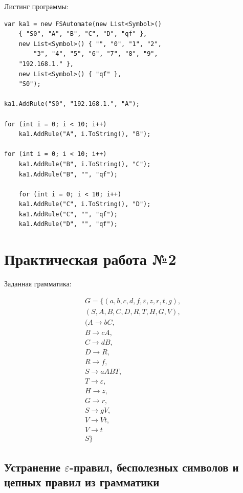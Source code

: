 \documentclass[12pt]{extarticle}
\begin{document}
	\noindent Листинг программы:
		
	\begin{lstlisting}
var ka1 = new FSAutomate(new List<Symbol>()
	{ "S0", "A", "B", "C", "D", "qf" },
	new List<Symbol>() { "", "0", "1", "2",
		"3", "4", "5", "6", "7", "8", "9",
	"192.168.1." },
	new List<Symbol>() { "qf" },
	"S0");
	
ka1.AddRule("S0", "192.168.1.", "A");
		
for (int i = 0; i < 10; i++)
	ka1.AddRule("A", i.ToString(), "B");
		
for (int i = 0; i < 10; i++)
	ka1.AddRule("B", i.ToString(), "C");
	ka1.AddRule("B", "", "qf");
		
	for (int i = 0; i < 10; i++)
	ka1.AddRule("C", i.ToString(), "D");
	ka1.AddRule("C", "", "qf");
	ka1.AddRule("D", "", "qf");
	\end{lstlisting}
	
	\section{Практическая работа №2}
	
	Заданная грамматика:
	
	\begin{gather*}
		G = \{(a, b, c, d, f, \varepsilon, z, r, t, g), \\
			(S, A, B, C, D, R, T, H, G, V), \\
			(A \rightarrow bC, \\
			 B \rightarrow cA, \\
			 C \rightarrow dB, \\
			 D \rightarrow R, \\
			 R \rightarrow f, \\
			 S \rightarrow aABT, \\ 
			 T \rightarrow \varepsilon, \\ 
			 H \rightarrow z, \\
			 G \rightarrow r, \\ 
			 S \rightarrow gV, \\ 
			 V \rightarrow Vt, \\ 
			 V \rightarrow t \\
			S \}
	\end{gather*}
	
	\subsection{Устранение $\varepsilon$-правил, бесполезных символов и цепных правил из грамматики}
	
\end{document}
